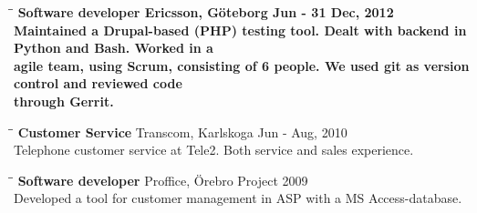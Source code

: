 \documentclass[11pt]{res}
\begin{document}
\begin{resume}
\begin{tabbing}
 \end{tabbing}

\vspace{-30pt}

\begin{tabbing}
 \hspace{2.3in}\= \hspace{2.6in}\= \kill %
 \bf {Software developer} \>Ericsson, Göteborg  Jun - 31 Dec, 2012\\
	Maintained a Drupal-based (PHP) testing tool. Dealt with backend in Python and Bash. Worked in a \\ agile team, using Scrum, consisting of 6 people. We used git as version control and reviewed code \\ through Gerrit. 
\end{tabbing}
\newpage

	   \begin{tabbing}
		 \hspace{2.3in}\= \hspace{2.6in}\= \kill %
		 {\bf Customer Service} \>Transcom, Karlskoga    \>Jun - Aug, 2010\\
		 Telephone customer service at Tele2. Both service and sales experience. 
	   \end{tabbing}

\vspace{-30pt}     

	  \begin{tabbing}
		  \hspace{2.3in}\= \hspace{2.6in}\= \kill %
		  {\bf Software developer} \>Proffice, Örebro \>Project 2009\\
		  Developed a tool for customer management in ASP with a MS Access-database.
	  \end{tabbing}

\end{resume}
\end{document}
